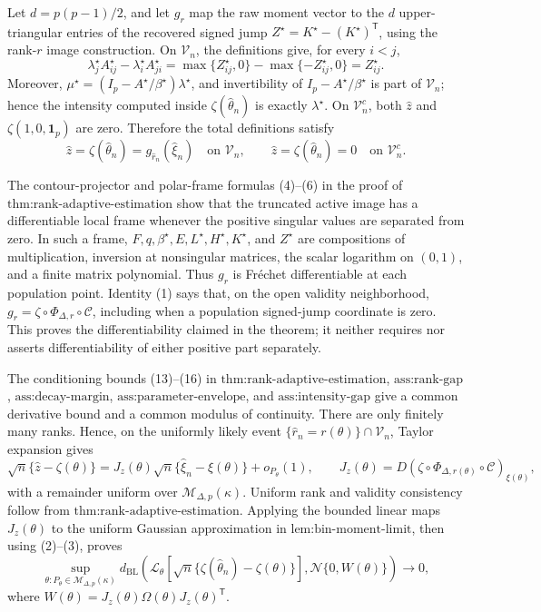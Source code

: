 Let \(d=p(p-1)/2\), and let \(g_r\) map the raw moment vector to the \(d\) upper-triangular entries of the recovered signed jump \(Z^\star=K^\star-(K^\star)^{\mathsf T}\), using the rank-\(r\) image construction.  On \(\mathcal V_n\), the definitions give, for every \(i<j\),
\[
 \lambda_j^\star A_{ij}^\star-\lambda_i^\star A_{ji}^\star
 =\max\{Z_{ij}^\star,0\}-\max\{-Z_{ij}^\star,0\}
 =Z_{ij}^\star.
\tag{1}
\]
Moreover, \(\mu^\star=(I_p-A^\star/\beta^\star)\lambda^\star\), and invertibility of \(I_p-A^\star/\beta^\star\) is part of \(\mathcal V_n\); hence the intensity computed inside \(\zeta(\widehat\theta_n)\) is exactly \(\lambda^\star\).  On \(\mathcal V_n^c\), both \(\widehat z\) and \(\zeta(1,0,\mathbf1_p)\) are zero.  Therefore the total definitions satisfy
\[
 \widehat z=\zeta(\widehat\theta_n)
 =g_{\widehat r_n}(\widehat\xi_n)\quad\text{on }\mathcal V_n,
 \qquad
 \widehat z=\zeta(\widehat\theta_n)=0\quad\text{on }\mathcal V_n^c.
\tag{2}
\]

The contour-projector and polar-frame formulas (4)--(6) in the proof of \(\text{thm:rank-adaptive-estimation}\) show that the truncated active image has a differentiable local frame whenever the positive singular values are separated from zero.  In such a frame, \(F,q,\beta^\star,E,L^\star,H^\star,K^\star\), and \(Z^\star\) are compositions of multiplication, inversion at nonsingular matrices, the scalar logarithm on \((0,1)\), and a finite matrix polynomial.  Thus \(g_r\) is Fr\'{e}chet differentiable at each population point.  Identity (1) says that, on the open validity neighborhood, \(g_r=\zeta\circ\Phi_{\Delta,r}\circ\mathcal C\), including when a population signed-jump coordinate is zero.  This proves the differentiability claimed in the theorem; it neither requires nor asserts differentiability of either positive part separately.

The conditioning bounds (13)--(16) in \(\text{thm:rank-adaptive-estimation}\), \(\text{ass:rank-gap}\), \(\text{ass:decay-margin}\), \(\text{ass:parameter-envelope}\), and \(\text{ass:intensity-gap}\) give a common derivative bound and a common modulus of continuity.  There are only finitely many ranks.  Hence, on the uniformly likely event \(\{\widehat r_n=r(\theta)\}\cap\mathcal V_n\), Taylor expansion gives
\[
 \sqrt n\{\widehat z-\zeta(\theta)\}
 =J_z(\theta)\sqrt n\{\widehat\xi_n-\xi(\theta)\}+o_{P_\theta}(1),
 \qquad
 J_z(\theta)=D(\zeta\circ\Phi_{\Delta,r(\theta)}\circ\mathcal C)_{\xi(\theta)},
\tag{3}
\]
with a remainder uniform over \(\mathcal M_{\Delta,p}(\kappa)\).  Uniform rank and validity consistency follow from \(\text{thm:rank-adaptive-estimation}\).  Applying the bounded linear maps \(J_z(\theta)\) to the uniform Gaussian approximation in \(\text{lem:bin-moment-limit}\), then using (2)--(3), proves
\[
 \sup_{\theta:P_\theta\in\mathcal M_{\Delta,p}(\kappa)}
 d_{\mathrm{BL}}\!\left(
 \mathcal L_\theta[\sqrt n\{\zeta(\widehat\theta_n)-\zeta(\theta)\}],
 \mathcal N\{0,W(\theta)\}\right)\longrightarrow0,
\tag{4}
\]
where \(W(\theta)=J_z(\theta)\Omega(\theta)J_z(\theta)^{\mathsf T}\).

